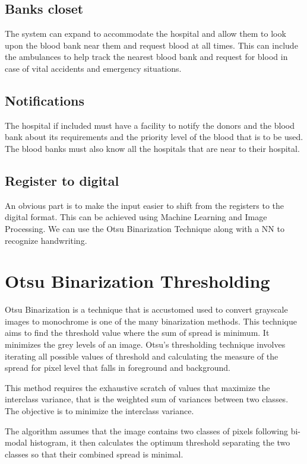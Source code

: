 \documentclass[BTech]{srmuthesis}
\begin{document}
\section{Banks closet}
The system can expand to accommodate the hospital and allow them to look upon the blood bank near them and request blood at all times. This can include the ambulances to help track the nearest blood bank and request for blood in case of vital accidents and emergency situations.
\section{Notifications}
The hospital if included must have a facility to notify the donors and the blood bank about its requirements and the priority level of the blood that is to be used. The blood banks must also know all the hospitals that are near to their hospital.
\section{Register to digital}
An obvious part is to make the input easier to shift from the registers to the digital format. This can be achieved using Machine Learning and Image Processing. We can use the Otsu Binarization Technique along with a NN to recognize handwriting.



\appendix
\chapter{Otsu Binarization Thresholding}
Otsu Binarization is a technique that is accustomed used to convert grayscale images to monochrome is one of the many binarization methods.
This technique aims to find the threshold value where the sum of spread is minimum. It minimizes the grey levels of an image. Otsu’s thresholding technique involves iterating all possible values of threshold and calculating the measure of the spread for pixel level that falls in foreground and background.

This method requires the exhaustive scratch of values that maximize the interclass variance, that is the weighted sum of variances between two classes. The objective is to minimize the interclass variance.

The algorithm assumes that the image contains two classes of pixels following bi-modal histogram, it then calculates the optimum threshold separating the two classes so that their combined spread is minimal.
\end{document}
